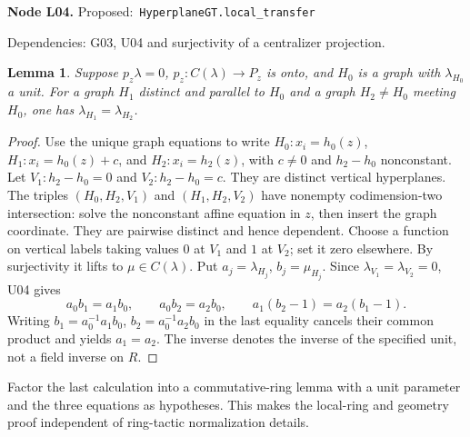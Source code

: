 \documentclass[11pt]{article}
\newtheorem{lemma}[theorem]{Lemma}
\theoremstyle{remark}\newtheorem{remark}[theorem]{Remark}
\newcommand{\code}[1]{\nolinkurl{#1}}
\newcommand{\node}[3]{\par\Needspace{8\baselineskip}\smallskip\noindent\textbf{Node #1.}\quad
 \textsf{Proposed:}\ \code{#2}\par\noindent
 \textsf{Dependencies:} #3.\par\smallskip}
\begin{document}
\node{L04}{HyperplaneGT.local_transfer}{G03, U04 and surjectivity of a centralizer projection}
\begin{lemma}\label{lem:l04}
Suppose $p_z\lambda=0$, $p_z:C(\lambda)\to P_z$ is onto, and
$H_0$ is a graph with $\lambda_{H_0}$ a unit. For a graph $H_1$
distinct and parallel to $H_0$ and a graph $H_2\ne H_0$ meeting
$H_0$, one has $\lambda_{H_1}=\lambda_{H_2}$.
\end{lemma}
\begin{proof}
Use the unique graph equations to write
$H_0:x_i=h_0(z)$, $H_1:x_i=h_0(z)+c$, and
$H_2:x_i=h_2(z)$, with $c\ne0$ and $h_2-h_0$ nonconstant.
Let $V_1:h_2-h_0=0$ and $V_2:h_2-h_0=c$. They are distinct
vertical hyperplanes. The triples $(H_0,H_2,V_1)$ and
$(H_1,H_2,V_2)$ have nonempty codimension-two intersection:
solve the nonconstant affine equation in $z$, then insert the
graph coordinate. They are pairwise distinct and hence dependent.
Choose a function on vertical labels taking values $0$ at $V_1$
and $1$ at $V_2$; set it zero elsewhere. By surjectivity it lifts
to $\mu\in C(\lambda)$. Put $a_j=\lambda_{H_j}$,
$b_j=\mu_{H_j}$. Since $\lambda_{V_1}=\lambda_{V_2}=0$,
U04 gives
\[
 a_0b_1=a_1b_0,\qquad a_0b_2=a_2b_0,\qquad
 a_1(b_2-1)=a_2(b_1-1).
\]
Writing $b_1=a_0^{-1}a_1b_0$, $b_2=a_0^{-1}a_2b_0$ in the
last equality cancels their common product and yields $a_1=a_2$.
The inverse denotes the inverse of the specified unit, not a
field inverse on $R$.
\end{proof}
Factor the last calculation into a commutative-ring lemma with a
unit parameter and the three equations as hypotheses. This makes
the local-ring and geometry proof independent of ring-tactic
normalization details.
\end{document}
